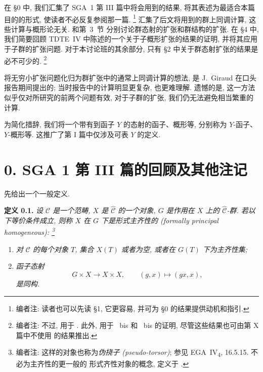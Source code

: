 在 \S0 中, 我们汇集了 SGA~1 第 III 篇中将会用到的结果,
将其表述为最适合本篇目的的形式, 使读者不必反复参阅那一篇.
\footnote{编者注: 读者也可以先读 \S1, 它更容易, 并可为 \S0
的结果提供动机和指引.}
汇集了后文将用到的群上同调计算,
这些计算与概形论无关. 和第~3~节
分别讨论群态射的扩张和群结构的扩张. 在 \S4 中, 我们简要回顾 TDTE~IV
中陈述的一个关于子概形扩张的结果的证明, 并将其应用于子群的扩张问题.
对于本讨论班的其余部分, 只有 \S2 中关于群态射扩张的结果是必不可少的.
\footnote{编者注: 不过, 
用于 . 此外,
 用于
~bis 和
~bis 的证明,
尽管这些结果也可由第 X 篇中不使用
 的结果推出.}

将无穷小扩张问题化归为群扩张中的通常上同调计算的想法, 是 J.~Giraud
在口头报告期间提出的; 当时报告中的计算明显更复杂, 也更难理解.
遗憾的是, 这一方法似乎仅对所研究的前两个问题有效,
对于子群的扩张, 我们仍无法避免相当繁重的计算.

为简化措辞, 我们将一个带有到函子 \(Y\) 的态射的函子、概形等,
分别称为 \(Y\)-函子、\(Y\)-概形等. 这推广了第 I 篇中仅涉及可表
\(Y\) 的定义.

\section*{0. SGA 1 第 III 篇的回顾及其他注记}

先给出一个一般定义.

\medskip
{}\noindent\textbf{定义 0.1.}
\textit{设 \(\mathscr C\) 是一个范畴, \(X\) 是
\(\widehat{\mathscr C}\) 的一个对象, \(G\) 是作用在 \(X\) 上的
\(\widehat{\mathscr C}\)-群. 若以下等价条件成立, 则称 \(X\)
在 \(G\) 下是\emph{形式主齐性的 (formally principal homogeneous)}:
\footnote{编者注: 这样的对象也称为\emph{伪挠子 (pseudo-torsor)};
参见 EGA~IV\textsubscript{4}, 16.5.15. 不必为主齐性的更一般的
形式齐性对象的概念, 定义于
.}}
\begin{enumerate}
\item[(i)] \textit{对 \(\mathscr C\) 的每个对象 \(T\), 集合
  \(X(T)\) 或者为空, 或者在 \(G(T)\) 下为主齐性集;}
\item[(ii)] \textit{函子态射
  \[
    G\times X\longrightarrow X\times X,
    \qquad (g,x)\longmapsto(gx,x),
  \]
  是同构.}
\end{enumerate}

